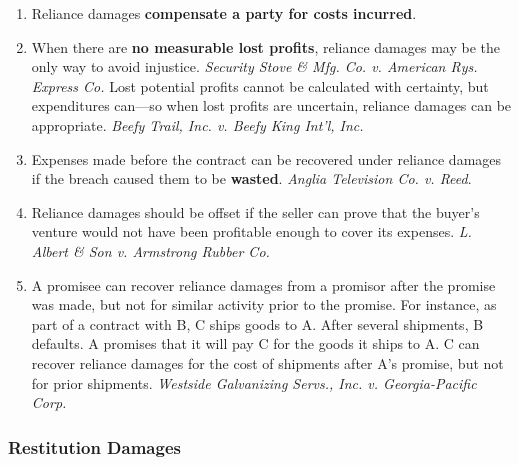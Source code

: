 \begin{enumerate}
    \item Reliance damages \textbf{compensate a party for costs incurred}.
    \item When there are \textbf{no measurable lost profits}, reliance damages 
    may be the only way to avoid injustice. \emph{Security Stove \& Mfg. Co.  
    v.  American Rys. Express Co.} Lost potential profits cannot be calculated 
    with certainty, but expenditures can---so when lost profits are uncertain, 
    reliance damages can be appropriate. \emph{Beefy Trail, Inc. v. Beefy King 
    Int'l, Inc.}
    \item Expenses made before the contract can be recovered under reliance 
    damages if the breach caused them to be \textbf{wasted}. \emph{Anglia 
    Television Co. v. Reed}.
    \item Reliance damages should be offset if the seller can prove that 
    the buyer's venture would not have been profitable enough to cover its 
    expenses. \emph{L. Albert \& Son v. Armstrong Rubber Co.}
    \item A promisee can recover reliance damages from a promisor after the 
    promise was made, but not for similar activity prior to the promise. For 
    instance, as part of a contract with B, C ships goods to A. After several 
    shipments, B defaults. A promises that it will pay C for the goods it 
    ships to A. C can recover reliance damages for the cost of shipments after 
    A's promise, but not for prior shipments. \emph{Westside Galvanizing 
    Servs., Inc. v. Georgia-Pacific Corp.}
\end{enumerate}

\subsubsection{Restitution Damages}

